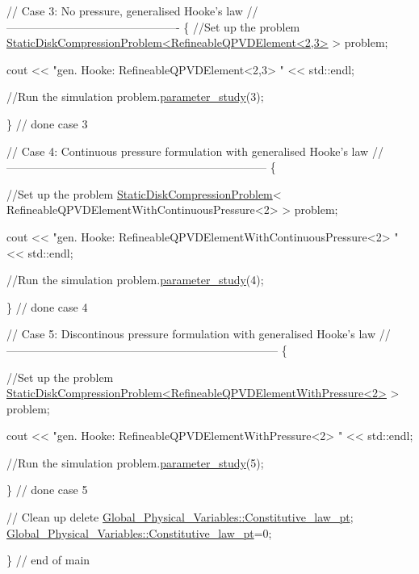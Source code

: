 \begin{DoxyCodeInclude}
 
 \textcolor{comment}{// Case 3: No pressure, generalised Hooke's law}
 \textcolor{comment}{//----------------------------------------------}
 \{
  \textcolor{comment}{//Set up the problem}
  \hyperlink{classStaticDiskCompressionProblem}{StaticDiskCompressionProblem<RefineableQPVDElement<2,3>}
       > problem;
  
  cout << \textcolor{stringliteral}{"gen. Hooke: RefineableQPVDElement<2,3> "} << std::endl;
  
  \textcolor{comment}{//Run the simulation}
  problem.\hyperlink{classStaticDiskCompressionProblem_ac64db4786efde78e70b1110422331b02}{parameter\_study}(3);  

 \}  \textcolor{comment}{// done case 3}
 
 \textcolor{comment}{// Case 4: Continuous pressure formulation with generalised Hooke's law}
 \textcolor{comment}{//---------------------------------------------------------------------}
 \{
  
  \textcolor{comment}{//Set up the problem}
  \hyperlink{classStaticDiskCompressionProblem}{StaticDiskCompressionProblem}<
   RefineableQPVDElementWithContinuousPressure<2> > problem;
  
  cout << \textcolor{stringliteral}{"gen. Hooke: RefineableQPVDElementWithContinuousPressure<2> "} 
       << std::endl;
  
  \textcolor{comment}{//Run the simulation}
  problem.\hyperlink{classStaticDiskCompressionProblem_ac64db4786efde78e70b1110422331b02}{parameter\_study}(4);
  
 \}  \textcolor{comment}{// done case 4}
 
 
 \textcolor{comment}{// Case 5:  Discontinous pressure formulation with generalised Hooke's law}
 \textcolor{comment}{//------------------------------------------------------------------------}
 \{
  
  \textcolor{comment}{//Set up the problem}
  \hyperlink{classStaticDiskCompressionProblem}{StaticDiskCompressionProblem<RefineableQPVDElementWithPressure<2>}
       > problem;
  
  cout << \textcolor{stringliteral}{"gen. Hooke: RefineableQPVDElementWithPressure<2> "} << std::endl;
  
  \textcolor{comment}{//Run the simulation}
  problem.\hyperlink{classStaticDiskCompressionProblem_ac64db4786efde78e70b1110422331b02}{parameter\_study}(5);
    
 \}  \textcolor{comment}{// done case 5}
 
 \textcolor{comment}{// Clean up }
 \textcolor{keyword}{delete} \hyperlink{namespaceGlobal__Physical__Variables_a2a37fb040c832ee7a086bb13bb02a100}{Global\_Physical\_Variables::Constitutive\_law\_pt};
 \hyperlink{namespaceGlobal__Physical__Variables_a2a37fb040c832ee7a086bb13bb02a100}{Global\_Physical\_Variables::Constitutive\_law\_pt}=0;
 
\} \textcolor{comment}{// end of main}

\end{DoxyCodeInclude}





